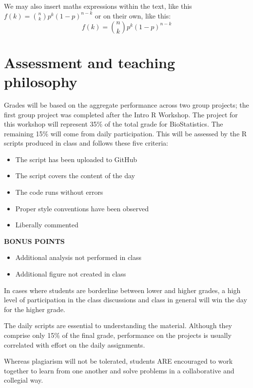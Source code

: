 \documentclass[english,10pt,a4paper,oneside]{book}
\providecommand{\tightlist}{%
  \setlength{\itemsep}{0pt}\setlength{\parskip}{0pt}}
\theoremstyle{definition}
\theoremstyle{definition}
\theoremstyle{definition}
\theoremstyle{remark}
\begin{document}
We may also insert maths expressions within the text, like this
\(f(k) = {n \choose k} p^{k} (1-p)^{n-k}\) or on their own, like this:
\[f(k) = {n \choose k} p^{k} (1-p)^{n-k}\]

\hypertarget{assessment-and-teaching-philosophy}{%
\section{Assessment and teaching
philosophy}\label{assessment-and-teaching-philosophy}}

Grades will be based on the aggregate performance across two group
projects; the first group project was completed after the Intro R
Workshop. The project for this workshop will represent 35\% of the total
grade for BioStatistics. The remaining 15\% will come from daily
participation. This will be assessed by the R scripts produced in class
and follows these five criteria:

\begin{itemize}
\tightlist
\item
  The script has been uploaded to GitHub
\item
  The script covers the content of the day
\item
  The code runs without errors
\item
  Proper style conventions have been observed
\item
  Liberally commented
\end{itemize}

\textbf{BONUS POINTS}

\begin{itemize}
\tightlist
\item
  Additional analysis not performed in class
\item
  Additional figure not created in class
\end{itemize}

In cases where students are borderline between lower and higher grades,
a high level of participation in the class discussions and class in
general will win the day for the higher grade.

The daily scripts are essential to understanding the material. Although
they comprise only 15\% of the final grade, performance on the projects
is usually correlated with effort on the daily assignments.

Whereas plagiarism will not be tolerated, students ARE encouraged to
work together to learn from one another and solve problems in a
collaborative and collegial way.
\end{document}
